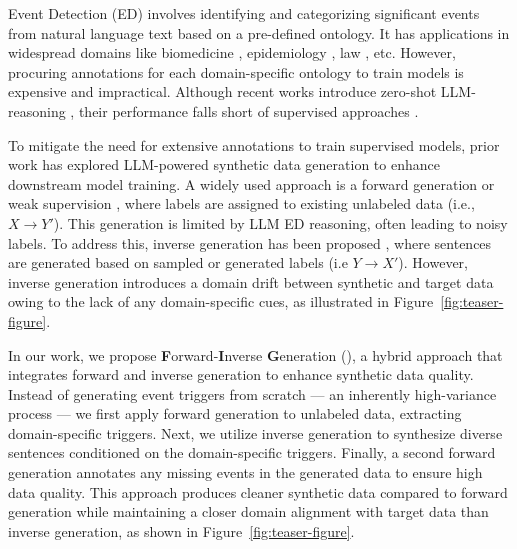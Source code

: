 Event Detection (ED) \cite{sundheim-1992-overview, doddington-etal-2004-automatic} involves identifying and categorizing significant events from natural language text based on a pre-defined ontology. It has applications in widespread domains like biomedicine \cite{mlee}, epidemiology \cite{parekh-etal-2024-speed, parekh-etal-2024-event}, law \cite{DBLP:conf/lrec/2010legal}, etc.
However, procuring annotations for each domain-specific ontology to train models is expensive and impractical.
Although recent works introduce zero-shot LLM-reasoning \cite{DBLP:journals/corr/abs-2303-03836, cai-etal-2024-improving-event}, their performance falls short of supervised approaches \cite{huang-etal-2024-textee}.

To mitigate the need for extensive annotations to train supervised models, prior work has explored LLM-powered synthetic data generation to enhance downstream model training.
A widely used approach is a forward generation or weak supervision \cite{DBLP:journals/corr/abs-2106-06168, chia-etal-2022-relationprompt}, where labels are assigned to existing unlabeled data (i.e., $X\rightarrow Y'$). This generation is limited by LLM ED reasoning, often leading to noisy labels.
To address this, inverse generation has been proposed \cite{DBLP:journals/corr/abs-2202-04538, wang-etal-2023-self-instruct}, where sentences are generated based on sampled or generated labels (i.e $Y \rightarrow X'$).
However, inverse generation introduces a domain drift between synthetic and target data owing to the lack of any domain-specific cues, as illustrated in Figure~\ref{fig:teaser-figure}.

In our work, we propose \textbf{F}orward-\textbf{I}nverse \textbf{G}eneration (\modelName), a hybrid approach that integrates forward and inverse generation to enhance synthetic data quality.
Instead of generating event triggers from scratch — an inherently high-variance process — we first apply forward generation to unlabeled data, extracting domain-specific triggers.
Next, we utilize inverse generation to synthesize diverse sentences conditioned on the domain-specific triggers.
Finally, a second forward generation annotates any missing events in the generated data to ensure high data quality.
This approach produces cleaner synthetic data compared to forward generation while maintaining a closer domain alignment with target data than inverse generation, as shown in Figure~\ref{fig:teaser-figure}.

